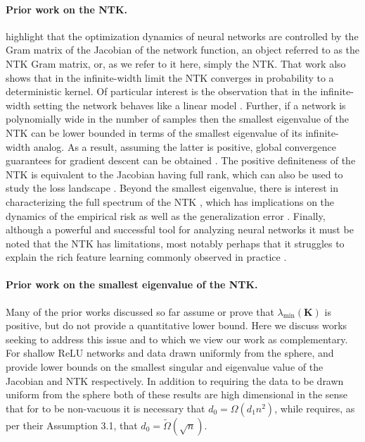\documentclass{article}
\theoremstyle{definition}
\def\mK{{\bm{K}}}
\begin{document}
\paragraph{Prior work on the NTK.} 
\citet{jacot2018neural} highlight that the optimization dynamics of neural networks are controlled by the Gram matrix of the Jacobian of the network function, an object referred to as the NTK Gram matrix, or, as we refer to it here, simply the NTK. That work also shows that in the infinite-width limit the NTK converges in probability to a deterministic kernel. 
Of particular interest is the observation that in the infinite-width setting the network behaves like a linear model \citep{Lee2019WideNN-SHORT}. 
Further, if a network is polynomially wide in the number of samples then the smallest eigenvalue of the NTK can be lower bounded in terms of the smallest eigenvalue of its infinite-width analog. As a result, assuming the latter is positive, global convergence guarantees for gradient descent can be obtained \citep{du2019gradient,du2018gradient,allenzhu2019convergence, zou2019improved,Lee2019WideNN-SHORT,Oymak2019TowardMO,zou2020gradient,marco,nguyenrelu, banerjee2023neural}. 
The positive definiteness of the NTK is equivalent to the Jacobian having full rank, which can also be used to study the loss landscape \citep{NEURIPS2020_b7ae8fec, LIU202285, karhadkar2023mildly}. 
Beyond the smallest eigenvalue, there is interest in characterizing the full spectrum of the NTK \citep{uniform_sphere_data,geifman2020similarity,NEURIPS2020_572201a4,bietti2021deep, murray2023characterizing}, which has implications on the dynamics of the empirical risk \citep{arora_exact_comp, velikanov2021explicit} as well as the generalization error \citep{cao2019towards, basri2020frequency, cui2021generalization,jin2022learning, bowman2022spectral}. Finally, although a powerful and successful tool for analyzing neural networks it must be noted that the NTK has limitations, most notably perhaps that it struggles to explain the rich feature learning commonly observed in practice  \citep{10.5555/3495724.3496995, lazy_training,NEURIPS2020_b7ae8fec}. 


\paragraph{Prior work on the smallest eigenvalue of the NTK.}Many of the prior works discussed so far assume or prove that $\lambda_{\min}(\mK)$ is positive, but do not provide a quantitative lower bound. Here we discuss works seeking to address this issue and to which we view our work as complementary. 
For shallow ReLU networks and data drawn uniformly from the sphere, \citet[Theorem 3]{xie2017diverse} and \citet[Theorem 3.2]{montanari2022interpolation} provide lower bounds on the smallest singular and eigenvalue value of the Jacobian and NTK respectively. 
In addition to requiring the data to be drawn uniform from the sphere both of these results are high dimensional in the sense that for \citet[Theorem 3]{xie2017diverse} to be non-vacuous it is necessary that $d_0 = \Omega(d_1 n^2)$, while \citet[Theorem 3.2]{montanari2022interpolation} requires, as per their Assumption 3.1, that $d_0 = \tilde{\Omega}(\sqrt{n})$. 
\end{document}
